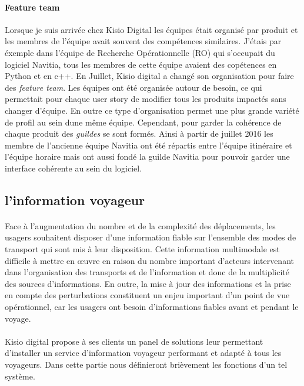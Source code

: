 \documentclass[a4paper]{report}
\begin{document}
\paragraph {Feature team} Lorsque je suis arrivée chez Kisio Digital les équipes était organisé par produit et les membres de l'équipe avait souvent des compétences similaires. J'étais par éxemple dans l'équipe de Recherche Opérationnelle (RO) qui s'occupait du logiciel Navitia, tous les membres de cette équipe avaient des copétences en Python et en c++. En Juillet, Kisio digital a changé son organisation pour faire des \emph{feature team}. Les équipes ont été organisée autour de besoin, ce qui permettait pour chaque user story de modifier tous les produits impactés sans changer d'équipe. En outre ce type d'organisation permet une plus grande variété de profil au sein dune même équipe. Cependant, pour garder la cohérence de chaque produit des \emph{guildes} se sont formés. Ainsi à partir de juillet 2016 les membre de l'ancienne équipe Navitia ont été répartis entre l'équipe itinéraire et l'équipe horaire mais ont aussi fondé la guilde Navitia pour pouvoir garder une interface cohérente au sein du logiciel.

\subsection{l'information voyageur}

\paragraph{} Face à l'augmentation du nombre et de la complexité des déplacements, les usagers souhaitent disposer d'une information fiable sur l'ensemble des modes de transport qui sont mis à leur disposition. Cette information multimodale est difficile à mettre en œuvre en raison du nombre important d'acteurs intervenant dans l'organisation des transports et de l'information et donc de la multiplicité des sources d’informations. En outre, la mise à jour des informations et la prise en compte des perturbations constituent un enjeu important d'un point de vue opérationnel, car les usagers ont besoin d'informations fiables avant et pendant le voyage.  

\paragraph{} Kisio digital propose à ses clients un panel de solutions leur permettant d'installer un service d'information voyageur performant et adapté à tous les voyageurs. Dans cette partie nous définieront brièvement les fonctions d'un tel système. 
\end{document}
